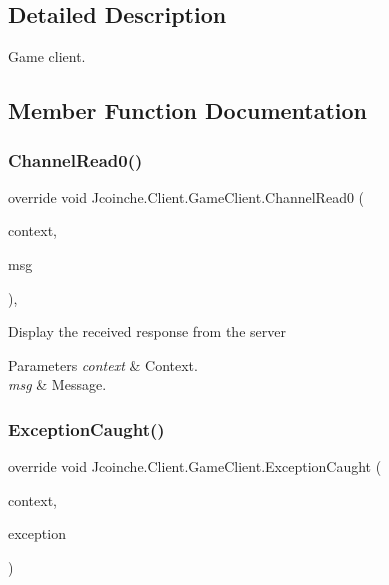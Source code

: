 \subsection{Detailed Description}
Game client. 



\subsection{Member Function Documentation}
\mbox{\label{class_jcoinche_1_1_client_1_1_game_client_ad0255d5488f5e3b8f0be7acbb93cc27b}} 
\subsubsection{\texorpdfstring{Channel\+Read0()}{ChannelRead0()}}
{\footnotesize\ttfamily override void Jcoinche.\+Client.\+Game\+Client.\+Channel\+Read0 (\begin{DoxyParamCaption}\item[{I\+Channel\+Handler\+Context}]{context,  }\item[{\hyperlink{class_jcoinche_1_1_google_1_1_protobuf_1_1_game_response}{Game\+Response}}]{msg }\end{DoxyParamCaption})\hspace{0.3cm}{\ttfamily [inline]}, {\ttfamily [protected]}}



Display the received response from the server 


\begin{DoxyParams}{Parameters}
{\em context} & Context.\\
\hline
{\em msg} & Message.\\
\hline
\end{DoxyParams}
\mbox{\label{class_jcoinche_1_1_client_1_1_game_client_a90930ab6c2df70474d6239269613b3a9}} 
\subsubsection{\texorpdfstring{Exception\+Caught()}{ExceptionCaught()}}
{\footnotesize\ttfamily override void Jcoinche.\+Client.\+Game\+Client.\+Exception\+Caught (\begin{DoxyParamCaption}\item[{I\+Channel\+Handler\+Context}]{context,  }\item[{Exception}]{exception }\end{DoxyParamCaption})\hspace{0.3cm}{\ttfamily [inline]}}



